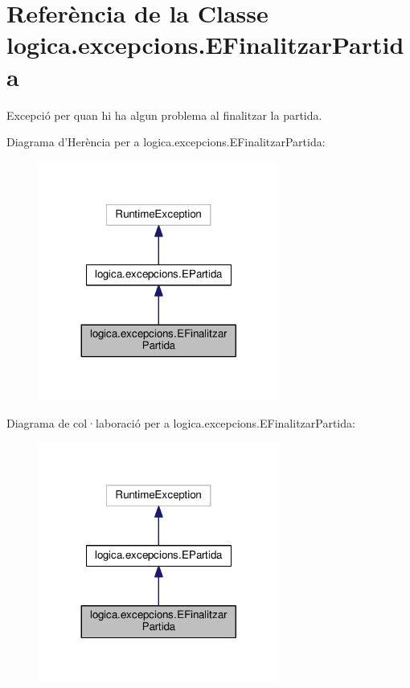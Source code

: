 \hypertarget{classlogica_1_1excepcions_1_1_e_finalitzar_partida}{\section{Referència de la Classe logica.\+excepcions.\+E\+Finalitzar\+Partida}
\label{classlogica_1_1excepcions_1_1_e_finalitzar_partida}
}


Excepció per quan hi ha algun problema al finalitzar la partida.  




Diagrama d'Herència per a logica.\+excepcions.\+E\+Finalitzar\+Partida\+:
\nopagebreak
\begin{figure}[H]
\begin{center}
\leavevmode
\includegraphics[width=224pt]{classlogica_1_1excepcions_1_1_e_finalitzar_partida__inherit__graph}
\end{center}
\end{figure}


Diagrama de col·laboració per a logica.\+excepcions.\+E\+Finalitzar\+Partida\+:
\nopagebreak
\begin{figure}[H]
\begin{center}
\leavevmode
\includegraphics[width=224pt]{classlogica_1_1excepcions_1_1_e_finalitzar_partida__coll__graph}
\end{center}
\end{figure}
